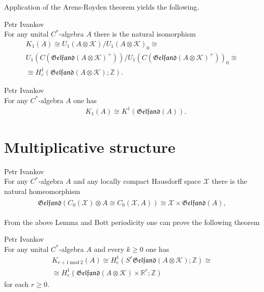 \documentclass{beamer}
\theoremstyle{plain}
\newcommand{\Z}{\mathbb{Z}}
\newcommand{\bean}{\begin{eqnarray*}}
\newcommand{\eean}{\end{eqnarray*}}
\newcommand{\R}{\mathbb{R}}
\newcommand{\K}{\mathcal{K}}
\newcommand{\sX}{\mathcal{X}}       %
\begin{document}
\begin{frame}
Application of the Arens-Royden theorem yields the following.
\begin{theorem}\label{k_1_coh_lem}\alert{Petr Ivankov}\\
	For any unital $C^*$-algebra $A$ there is the natural isomorphism
	\bean
	K_1\left(A \right) \cong U_1\left( A \otimes \K \right) / U_1\left( A \otimes \K \right)_0\cong \\ 	U_1\left( C\left( \mathfrak{Gelfand}\left(  A \otimes \K\right)^+\right)\right)/ U_1\left( C\left( \mathfrak{Gelfand}\left(  A \otimes \K\right)^+\right)\right)_0 \cong \\ \cong H^1_c\left( \mathfrak{Gelfand}\left(  A \otimes \K\right); \Z \right). 
	\eean 
\end{theorem}

\begin{theorem}\alert{Petr Ivankov}\\
	For any   $C^*$-algebra $A$ one has
	\bean
 \quad K_1\left(A \right)  \cong K^1\left(\mathfrak{Gelfand}\left(  A \right) \right).
	\eean
\end{theorem}

\end{frame}

\section{Multiplicative structure}
\begin{frame}
	\begin{lemma}\alert{Petr Ivankov}\\
		For any $C^*$-algebra $A$ and any locally compact Hausdorff space $\sX$ there is the natural homeomorphism
		\bean
		\begin{split}
			\mathfrak{Gelfand}\left(C_0\left(\sX \right)\otimes  A \cong C_0\left(\sX, A \right) \right) \cong \sX \times \mathfrak{Gelfand}\left(A \right),
		\end{split}
		\eean
	\end{lemma}
	From the above Lemma and Bott periodicity one can prove the following theorem
	\begin{theorem}\alert{Petr Ivankov}\\
		For any unital $C^*$-algebra $A$ and every	 $k \ge 0$ one has
			\bean
		K_{r+1~ \mathrm{mod}~2 }\left(A \right) \cong H^1_c\left(S^{r}\mathfrak{Gelfand}\left(A \otimes \K\right); \Z \right)\cong \\ \cong H^1_c\left(\mathfrak{Gelfand}\left(A \otimes \K\right)\times \R^{r}; \Z \right)
		\eean
		for each $r \ge 0$.
	\end{theorem}
	
\end{frame}
\end{document}
